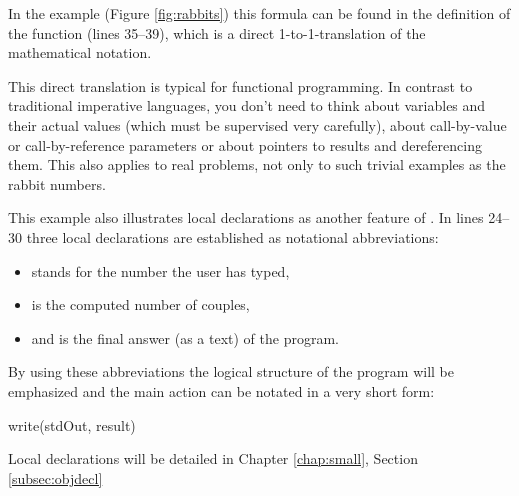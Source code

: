 In the example (Figure \ref{fig:rabbits})
this formula can be found in the definition of the
function  (lines 35--39), which is a direct
1-to-1-translation of the mathematical notation.

\advanced This direct translation is typical for functional
programming. 
In contrast to traditional imperative languages, you don't need to
think about variables and their actual values (which 
must be supervised very carefully), about call-by-value or
call-by-reference parameters or about pointers to results and
dereferencing them.
 This also applies to real problems, not only to  such trivial
examples as the rabbit numbers.

\novice This example also illustrates local declarations as another
feature of \opal. 
In lines 24--30 three local declarations are established as
notational abbreviations:
\begin{itemize}
\item {} stands for the number the user has typed,
\item {} is the computed number of couples,
\item and  is the final answer (as a text) of the program.
\end{itemize}

By using these abbreviations the logical structure of the program will be
emphasized and the main action can be notated in a very short form:
\begin{prog}
      write(stdOut, result)
\end{prog}
Local declarations will be  detailed in Chapter
\ref{chap:small}, Section \ref{subsec:objdecl}



